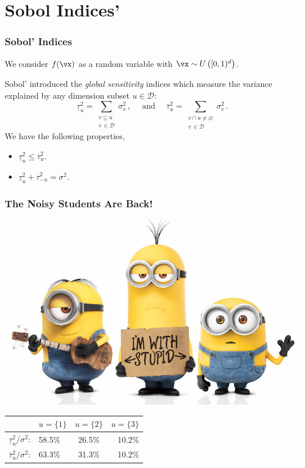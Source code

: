\documentclass[11pt,compress]{beamer} %
\begin{document}
\section{Sobol Indices'}

\begin{frame}
\frametitle{Sobol' Indices}
We consider $f(\vx)$ as a random variable with $\vx\sim U\left([0,1)^d\right)$.

Sobol' introduced the \emph{global sensitivity} indices which measure the variance explained by any dimension subset $u\in\mathcal{D}$:
\begin{equation*}
\underline{\tau}_u^2 = \sum_{\substack{v \subseteq u \\ v\,\in\mathcal{D}}} \sigma_v^2\, , \quad \text{ and } \quad \overline{\tau}_u^2 = \sum_{\substack{v \cap u\neq\varnothing \\ v\,\in\mathcal{D}}} \sigma_v^2\, .
\end{equation*}
We have the following properties,
\begin{itemize}
\item $\underline{\tau}_u^2\leq \overline{\tau}_u^2$.
\item $\underline{\tau}_u^2 + \overline{\tau}_{-u}^2 =\sigma^2$.
\end{itemize}
\end{frame}

\begin{frame}
\frametitle{The Noisy Students Are Back!}
\centering
\includegraphics[width=.55\textwidth]{minions.jpg}

\begin{tabular}{ll|c|r}
\hspace{-1.5cm} & $u=\{1\}$ & $u=\{2\}$ & $u=\{3\}$ \\
\hline
\hspace{-1.5cm}$\underline{\tau}_u^2/\sigma^2$: & 58.5\% & 26.5\% & 10.2\% \\
\hspace{-1.5cm}$\overline{\tau}_{u}^2/\sigma^2$: & 63.3\% & 31.3\% & 10.2\%
\end{tabular}
\end{frame}
\end{document}
